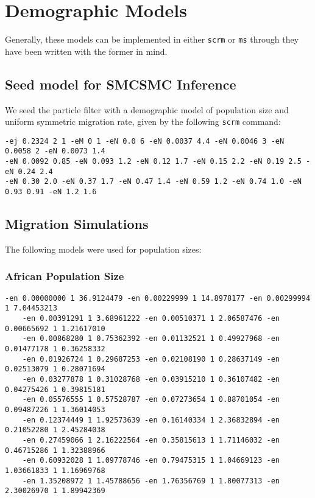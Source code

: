 \chapter{Demographic Models} \label{app:dem_model}

Generally, these models can be implemented in either {\tt scrm} or {\tt ms} through they have been written with the former in mind.

\section{Seed model for SMCSMC Inference} \label{app:dem_model:seed}


We seed the particle filter with a demographic model of population size and uniform symmetric migration rate, given by the following {\tt scrm} command:

\begin{Verbatim}[fontsize=\tiny]
-ej 0.2324 2 1 -eM 0 1 -eN 0.0 6 -eN 0.0037 4.4 -eN 0.0046 3 -eN 0.0058 2 -eN 0.0073 1.4 
-eN 0.0092 0.85 -eN 0.093 1.2 -eN 0.12 1.7 -eN 0.15 2.2 -eN 0.19 2.5 -eN 0.24 2.4 
-eN 0.30 2.0 -eN 0.37 1.7 -eN 0.47 1.4 -eN 0.59 1.2 -eN 0.74 1.0 -eN 0.93 0.91 -eN 1.2 1.6
\end{Verbatim}

\section{Migration Simulations}

The following models were used for population sizes:

\subsection{African Population Size}

\begin{Verbatim}[fontsize=\tiny]
    -en 0.00000000 1 36.9124479 -en 0.00229999 1 14.8978177 -en 0.00299994 1 7.04453213 
    -en 0.00391291 1 3.68961222 -en 0.00510371 1 2.06587476 -en 0.00665692 1 1.21617010
    -en 0.00868280 1 0.75362392 -en 0.01132521 1 0.49927968 -en 0.01477178 1 0.36258332
    -en 0.01926724 1 0.29687253 -en 0.02108190 1 0.28637149 -en 0.02513079 1 0.28071694
    -en 0.03277878 1 0.31028768 -en 0.03915210 1 0.36107482 -en 0.04275426 1 0.39815181
    -en 0.05576555 1 0.57528787 -en 0.07273654 1 0.88701054 -en 0.09487226 1 1.36014053
    -en 0.12374449 1 1.92573639 -en 0.16140334 1 2.36832894 -en 0.21052280 1 2.45284038
    -en 0.27459066 1 2.16222564 -en 0.35815613 1 1.71146032 -en 0.46715286 1 1.32388966
    -en 0.60932028 1 1.09778746 -en 0.79475315 1 1.04669123 -en 1.03661833 1 1.16969768
    -en 1.35208972 1 1.45788656 -en 1.76356769 1 1.80077313 -en 2.30026970 1 1.89942369
\end{Verbatim}

